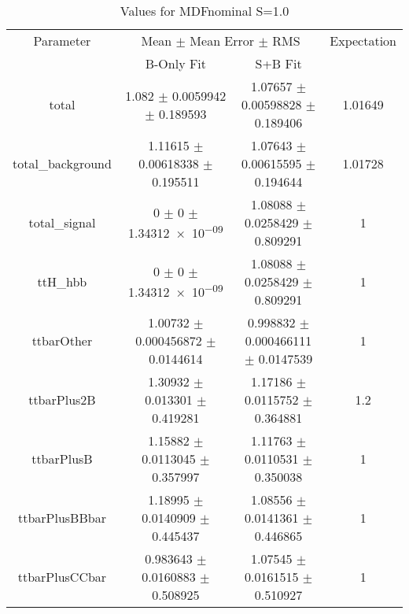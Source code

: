 \begin{table}
\centering
\caption{Values for MDFnominal S=1.0}
\begin{tabular}{cccc}
\toprule
Parameter & \multicolumn{2}{c}{Mean $\pm$ Mean Error $\pm$ RMS} & Expectation\\
 & B-Only Fit & S+B Fit & \\
\midrule
total & \num{1.082} $\pm$ \num{0.0059942} $\pm$ \num{0.189593} & \num{1.07657} $\pm$ \num{0.00598828} $\pm$ \num{0.189406} & \num{1.01649}\\
total\_background & \num{1.11615} $\pm$ \num{0.00618338} $\pm$ \num{0.195511} & \num{1.07643} $\pm$ \num{0.00615595} $\pm$ \num{0.194644} & \num{1.01728}\\
total\_signal & \num{0} $\pm$ \num{0} $\pm$ \num{1.34312e-09} & \num{1.08088} $\pm$ \num{0.0258429} $\pm$ \num{0.809291} & \num{1}\\
ttH\_hbb & \num{0} $\pm$ \num{0} $\pm$ \num{1.34312e-09} & \num{1.08088} $\pm$ \num{0.0258429} $\pm$ \num{0.809291} & \num{1}\\
ttbarOther & \num{1.00732} $\pm$ \num{0.000456872} $\pm$ \num{0.0144614} & \num{0.998832} $\pm$ \num{0.000466111} $\pm$ \num{0.0147539} & \num{1}\\
ttbarPlus2B & \num{1.30932} $\pm$ \num{0.013301} $\pm$ \num{0.419281} & \num{1.17186} $\pm$ \num{0.0115752} $\pm$ \num{0.364881} & \num{1.2}\\
ttbarPlusB & \num{1.15882} $\pm$ \num{0.0113045} $\pm$ \num{0.357997} & \num{1.11763} $\pm$ \num{0.0110531} $\pm$ \num{0.350038} & \num{1}\\
ttbarPlusBBbar & \num{1.18995} $\pm$ \num{0.0140909} $\pm$ \num{0.445437} & \num{1.08556} $\pm$ \num{0.0141361} $\pm$ \num{0.446865} & \num{1}\\
ttbarPlusCCbar & \num{0.983643} $\pm$ \num{0.0160883} $\pm$ \num{0.508925} & \num{1.07545} $\pm$ \num{0.0161515} $\pm$ \num{0.510927} & \num{1}\\
\bottomrule
\end{tabular}
\end{table}